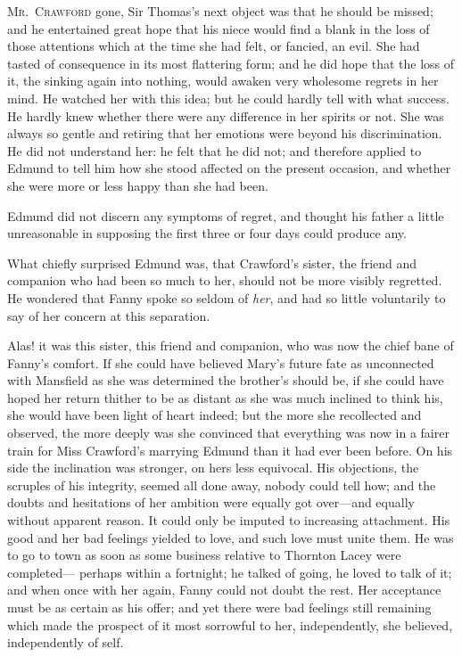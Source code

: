 \documentclass{article}
\newcommand{\gintro}[1]{\textcolor{gcolor}{\textsc{#1}}}
\begin{document}
\gintro{Mr.\ Crawford} gone, Sir Thomas's next object was that he
should be missed; and he entertained great hope that his
niece would find a blank in the loss of those attentions
which at the time she had felt, or fancied, an evil.
She had tasted of consequence in its most flattering form;
and he did hope that the loss of it, the sinking again
into nothing, would awaken very wholesome regrets
in her mind.  He watched her with this idea; but he
could hardly tell with what success.  He hardly knew
whether there were any difference in her spirits or not.
She was always so gentle and retiring that her emotions
were beyond his discrimination.  He did not understand her:
he felt that he did not; and therefore applied to Edmund
to tell him how she stood affected on the present occasion,
and whether she were more or less happy than she
had been.

Edmund did not discern any symptoms of regret, and thought
his father a little unreasonable in supposing the first
three or four days could produce any.

What chiefly surprised Edmund was, that Crawford's sister,
the friend and companion who had been so much to her,
should not be more visibly regretted.  He wondered that Fanny
spoke so seldom of \emph{her}, and had so little voluntarily
to say of her concern at this separation.

Alas! it was this sister, this friend and companion,
who was now the chief bane of Fanny's comfort.  If she
could have believed Mary's future fate as unconnected
with Mansfield as she was determined the brother's
should be, if she could have hoped her return thither
to be as distant as she was much inclined to think his,
she would have been light of heart indeed; but the more
she recollected and observed, the more deeply was she
convinced that everything was now in a fairer train
for Miss Crawford's marrying Edmund than it had ever
been before.  On his side the inclination was stronger,
on hers less equivocal.  His objections, the scruples of
his integrity, seemed all done away, nobody could tell how;
and the doubts and hesitations of her ambition were
equally got over---and equally without apparent reason.
It could only be imputed to increasing attachment.
His good and her bad feelings yielded to love, and such
love must unite them.  He was to go to town as soon as
some business relative to Thornton Lacey were completed---%
perhaps within a fortnight; he talked of going,
he loved to talk of it; and when once with her again,
Fanny could not doubt the rest.  Her acceptance must
be as certain as his offer; and yet there were bad
feelings still remaining which made the prospect of it
most sorrowful to her, independently, she believed,
independently of self.
\end{document}
